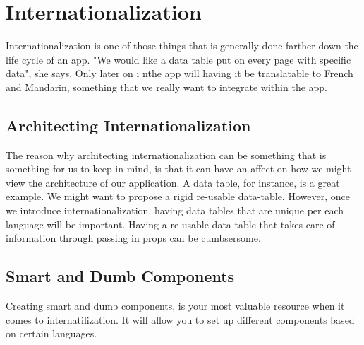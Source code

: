 \maketitle{}
\section{ Internationalization }

Internationalization is one of those things that is generally done farther down
the life cycle of an app. "We would like a data table put on every page with
specific data", she says. Only later on i nthe app will having it be
translatable to French and Mandarin, something that we really want to integrate
within the app.

\subsection{ Architecting Internationalization }
The reason why architecting internationalization can be something that is
something for us to keep in mind, is that it can have an affect on how we might
view the architecture of our application. A data table, for instance, is a great
example. We might want to propose a rigid re-usable data-table. However, once
we introduce internationalization, having data tables that are unique per each
language will be important. Having a re-usable data table that takes care of
information through passing in props can be cumbsersome.

\subsection{ Smart and Dumb Components }
Creating smart and dumb components, is your most valuable resource when it comes
to internatilization. It will allow you to set up different components based on
certain languages. 
